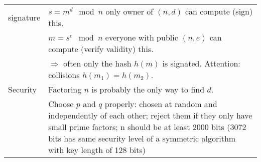 \begin{tabular}{|l| p{14.7cm}|}
									\cline{2-2}
	signature						&	$s=m^d \mod n$ only owner of $(n,d)$ can compute (sign) this.\\
									&	$m=s^e \mod n$ everyone with public $(n,e)$ can compute (verify validity) this.\\
									&	$\Rightarrow$ often only the hash $h(m)$ is signated. Attention: 
										collisions $h(m_1)=h(m_2)$.\\
									\cline{2-2}
	Security        & Factoring $n$ is probably the only way to find $d$.\\
									& Choose $p$ and $q$ properly: chosen at random and independently of each other; reject them if they only have small prime factors; n should be at least 2000 bits (3072 bits has same security level of a symmetric algorithm with key length of 128 bits)\\
	\hline
\end{tabular}